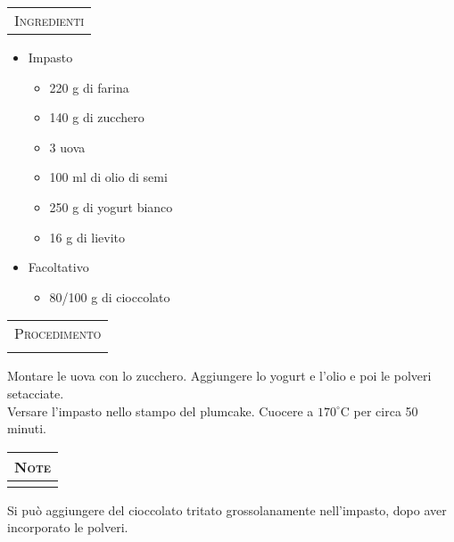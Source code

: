 \noindent
\begin{minipage}[t][\textheight][t]{\textwidth}


    \begin{minipage}[t]{0.3\textwidth}
        \vspace{2.5cm}

        \begin{tabularx}{\linewidth}{X}
        {\Large \textsc{Ingredienti}} \\ %
        \end{tabularx}

		\begin{itemize}[label={}, left=2pt]
		\item Impasto
        \begin{itemize}[label={}, left=10pt]
            \item 220 g di farina
            \item 140 g di zucchero
            \item 3 uova
            \item 100 ml di olio di semi
            \item 250 g di yogurt bianco
            \item 16 g di lievito
        \end{itemize}
        \item Facoltativo
        \begin{itemize}[label={}, left=10pt]
        		\item 80/100 g di cioccolato
        \end{itemize}
       	\end{itemize}
    \end{minipage}%
    \hfill
    \begin{minipage}[t]{0.65\textwidth}
        \begin{tabularx}{\linewidth}{X}
        \\
        {\Large \textsc{Procedimento}} \\ \\%
        \end{tabularx}
		Montare le uova con lo zucchero. Aggiungere lo yogurt e l'olio e poi le polveri setacciate.\\
		Versare l'impasto nello stampo del plumcake. Cuocere a $170^{\circ}$C per circa 50 minuti. 
        
    \end{minipage}
    
    \vspace*{\fill}

    \begin{tabularx}{\linewidth}{X}
    {\Large \textsc{Note}} \\ \hline \hline \\
    \end{tabularx}
	Si può aggiungere del cioccolato tritato grossolanamente nell'impasto, dopo aver incorporato le polveri.
    
\end{minipage}